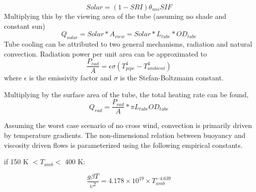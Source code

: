 \documentclass[heading.tex]{subfiles}
\begin{document}

\begin{equation}
Solar = (1-SRI) {\theta}_{nni} SIF
\end{equation}
Multiplying this by the viewing area of the tube (assuming no shade and constant sun)
\begin{equation}
Q_{solar} = Solar * A_{view} = Solar * L_{tube} * OD_{tube}
\end{equation}
Tube cooling can be attributed to two general mechanisms, radiation and natural convection. Radiation power per unit area can be
approximated to
\begin{equation}
\frac{P_{rad}}{A} = \epsilon \sigma (T_{pipe}^4 - T_{ambient}^4)
\end{equation}
where  $\epsilon$ is the emissivity factor and  $\sigma$ is the Stefan-Boltzmann constant.

Multiplying by the surface area of the tube, the total heating rate can be found,
\begin{equation}
Q_{rad} =  \frac{P_{rad}}{A} * \pi L_{tube} OD_{tube}
\end{equation}

Assuming the worst case scenario of no cross wind, convection is primarily driven by temperature gradients. The non-dimensional relation
between buoyancy and viscosity driven flows is parameterized using the following empirical constants. \cite{Berton} \cite{Incropera}

if 150 K $<  T_{amb} <$ 400 K:


\begin{equation}
\frac{g \beta T} {\upsilon^2} =  4.178\times10^{19} \times T_{amb}^{-4.639}
\end{equation}
\end{document}
